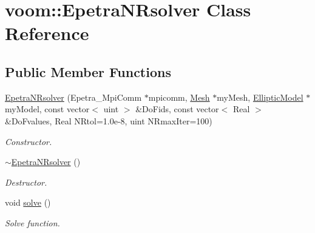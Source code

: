 \hypertarget{classvoom_1_1_epetra_n_rsolver}{
\section{voom::EpetraNRsolver Class Reference}
\label{classvoom_1_1_epetra_n_rsolver}
}
\subsection*{Public Member Functions}
\begin{DoxyCompactItemize}
\item 
\hypertarget{classvoom_1_1_epetra_n_rsolver_a29eb1cbcc2bcc71b006aba79e1606c0b}{
\hyperlink{classvoom_1_1_epetra_n_rsolver_a29eb1cbcc2bcc71b006aba79e1606c0b}{EpetraNRsolver} (Epetra\_\-MpiComm $\ast$mpicomm, \hyperlink{classvoom_1_1_mesh}{Mesh} $\ast$myMesh, \hyperlink{classvoom_1_1_elliptic_model}{EllipticModel} $\ast$myModel, const vector$<$ uint $>$ \&DoFids, const vector$<$ Real $>$ \&DoFvalues, Real NRtol=1.0e-\/8, uint NRmaxIter=100)}
\label{classvoom_1_1_epetra_n_rsolver_a29eb1cbcc2bcc71b006aba79e1606c0b}

\begin{DoxyCompactList}\small\item\em Constructor. \item\end{DoxyCompactList}\item 
\hypertarget{classvoom_1_1_epetra_n_rsolver_ae3b65247b085ed1fcaeb876c9926f697}{
\hyperlink{classvoom_1_1_epetra_n_rsolver_ae3b65247b085ed1fcaeb876c9926f697}{$\sim$EpetraNRsolver} ()}
\label{classvoom_1_1_epetra_n_rsolver_ae3b65247b085ed1fcaeb876c9926f697}

\begin{DoxyCompactList}\small\item\em Destructor. \item\end{DoxyCompactList}\item 
\hypertarget{classvoom_1_1_epetra_n_rsolver_af4f00db1556eede3b832bf6150521d37}{
void \hyperlink{classvoom_1_1_epetra_n_rsolver_af4f00db1556eede3b832bf6150521d37}{solve} ()}
\label{classvoom_1_1_epetra_n_rsolver_af4f00db1556eede3b832bf6150521d37}

\begin{DoxyCompactList}\small\item\em Solve function. \item\end{DoxyCompactList}\end{DoxyCompactItemize}

